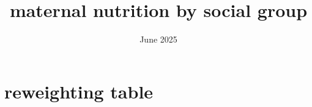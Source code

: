 \documentclass{article}
\title{maternal nutrition by social group}
\date{June 2025}
\begin{document}
\maketitle


\section{reweighting table}




\end{document}
